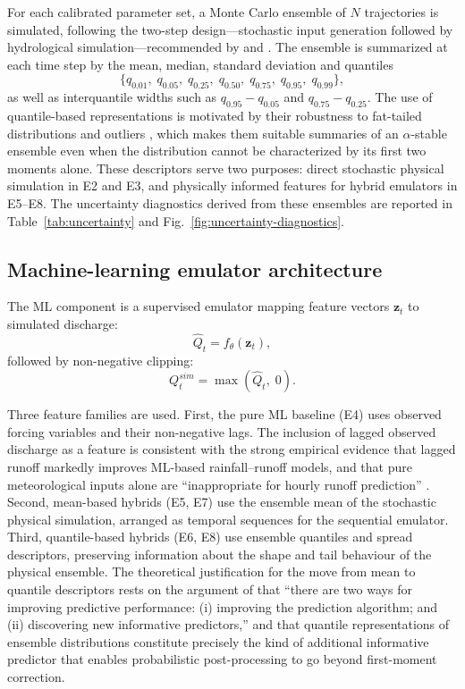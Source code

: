 \documentclass[a4paper,fleqn]{cas-sc}
\begin{document}
For each calibrated parameter set, a Monte Carlo ensemble of $N$
trajectories is simulated, following the two-step design---stochastic
input generation followed by hydrological simulation---recommended by
\citet{gabellani2007} and \citet{hong2006}. The ensemble is
summarized at each time step by the mean, median, standard deviation
and quantiles
\begin{equation}
\{q_{0.01},\;q_{0.05},\;q_{0.25},\;q_{0.50},\;q_{0.75},
  \;q_{0.95},\;q_{0.99}\},
\label{eq:quantiles}
\end{equation}
as well as interquantile widths such as $q_{0.95}-q_{0.05}$ and
$q_{0.75}-q_{0.25}$. The use of quantile-based representations is
motivated by their robustness to fat-tailed distributions and outliers
\citep{swiderski2016}, which makes them suitable summaries of an
$\alpha$-stable ensemble even when the distribution cannot be
characterized by its first two moments alone. These descriptors serve
two purposes: direct stochastic physical simulation in E2 and E3,
and physically informed features for hybrid emulators in E5--E8. The
uncertainty diagnostics derived from these ensembles are reported in
Table~\ref{tab:uncertainty} and Fig.~\ref{fig:uncertainty-diagnostics}.

\subsection{Machine-learning emulator architecture}
\label{subsec:emulator}

The ML component is a supervised emulator mapping feature vectors
$\mathbf{z}_t$ to simulated discharge:
\begin{equation}
\hat{Q}_t = f_\theta(\mathbf{z}_t),
\label{eq:emulator}
\end{equation}
followed by non-negative clipping:
\begin{equation}
Q^{sim}_t = \max(\hat{Q}_t,\;0).
\label{eq:ml-clipping}
\end{equation}

Three feature families are used. First, the pure ML baseline (E4) uses
observed forcing variables and their non-negative lags. The inclusion
of lagged observed discharge as a feature is consistent with the
strong empirical evidence that lagged runoff markedly improves ML-based
rainfall--runoff models, and that pure meteorological inputs alone are
``inappropriate for hourly runoff prediction''
\citep{adnan2021comparison}. Second, mean-based hybrids (E5, E7) use
the ensemble mean of the stochastic physical simulation, arranged as
temporal sequences for the sequential emulator. Third, quantile-based
hybrids (E6, E8) use ensemble quantiles and spread descriptors,
preserving information about the shape and tail behaviour of the
physical ensemble. The theoretical justification for the move from
mean to quantile descriptors rests on the argument of
\citet{papacharalampous2022} that ``there are two ways for improving
predictive performance: (i) improving the prediction algorithm; and
(ii) discovering new informative predictors,'' and that quantile
representations of ensemble distributions constitute precisely the
kind of additional informative predictor that enables probabilistic
post-processing to go beyond first-moment correction.
\end{document}
